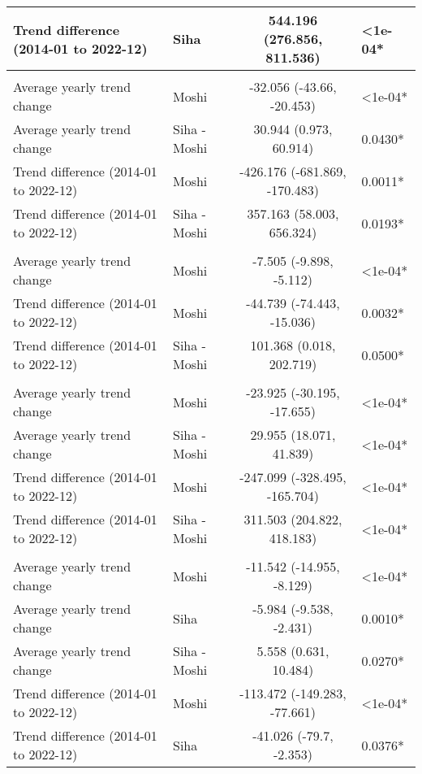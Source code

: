 \begin{longtable}{l|lcl}
Trend difference (2014-01 to 2022-12) & Siha & 544.196 (276.856, 811.536) & <1e-04* \\ 
\midrule\addlinespace[2.5pt]
\multicolumn{4}{l}{Caries} \\[2.5pt] 
\midrule\addlinespace[2.5pt]
Average yearly trend change & Moshi & -32.056 (-43.66, -20.453) & <1e-04* \\ 
Average yearly trend change & Siha - Moshi & 30.944 (0.973, 60.914) & 0.0430* \\ 
Trend difference (2014-01 to 2022-12) & Moshi & -426.176 (-681.869, -170.483) & 0.0011* \\ 
Trend difference (2014-01 to 2022-12) & Siha - Moshi & 357.163 (58.003, 656.324) & 0.0193* \\ 
\midrule\addlinespace[2.5pt]
\multicolumn{4}{l}{Dysentery} \\[2.5pt] 
\midrule\addlinespace[2.5pt]
Average yearly trend change & Moshi & -7.505 (-9.898, -5.112) & <1e-04* \\ 
Trend difference (2014-01 to 2022-12) & Moshi & -44.739 (-74.443, -15.036) & 0.0032* \\ 
Trend difference (2014-01 to 2022-12) & Siha - Moshi & 101.368 (0.018, 202.719) & 0.0500* \\ 
\midrule\addlinespace[2.5pt]
\multicolumn{4}{l}{Skin Infection - Fungal} \\[2.5pt] 
\midrule\addlinespace[2.5pt]
Average yearly trend change & Moshi & -23.925 (-30.195, -17.655) & <1e-04* \\ 
Average yearly trend change & Siha - Moshi & 29.955 (18.071, 41.839) & <1e-04* \\ 
Trend difference (2014-01 to 2022-12) & Moshi & -247.099 (-328.495, -165.704) & <1e-04* \\ 
Trend difference (2014-01 to 2022-12) & Siha - Moshi & 311.503 (204.822, 418.183) & <1e-04* \\ 
\midrule\addlinespace[2.5pt]
\multicolumn{4}{l}{Malnutrition} \\[2.5pt] 
\midrule\addlinespace[2.5pt]
Average yearly trend change & Moshi & -11.542 (-14.955, -8.129) & <1e-04* \\ 
Average yearly trend change & Siha & -5.984 (-9.538, -2.431) & 0.0010* \\ 
Average yearly trend change & Siha - Moshi & 5.558 (0.631, 10.484) & 0.0270* \\ 
Trend difference (2014-01 to 2022-12) & Moshi & -113.472 (-149.283, -77.661) & <1e-04* \\ 
Trend difference (2014-01 to 2022-12) & Siha & -41.026 (-79.7, -2.353) & 0.0376* \\ 

\end{longtable}
